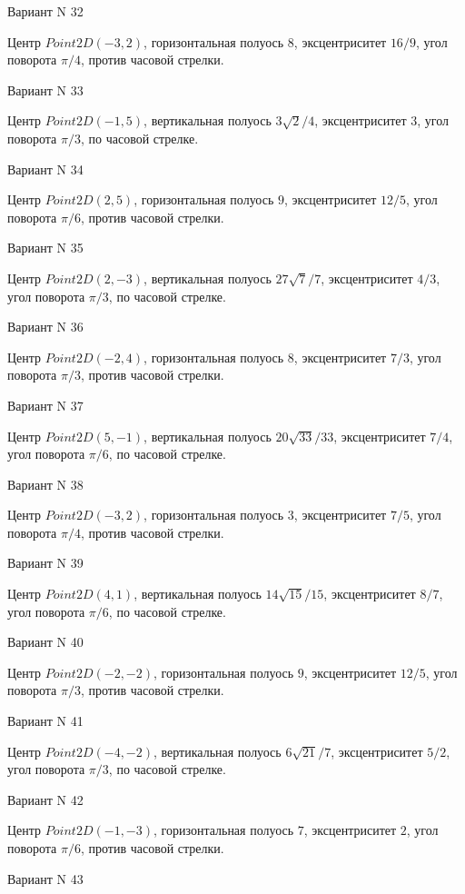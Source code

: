 \documentclass[11pt]{report}
\begin{document}
Вариант N 32

Центр $Point2D\left(-3, 2\right)$, горизонтальная полуось $8$, эксцентриситет $16 / 9$, угол поворота $\pi / 4$, против часовой стрелки.

Вариант N 33

Центр $Point2D\left(-1, 5\right)$, вертикальная полуось $3 \sqrt{2} / 4$, эксцентриситет $3$, угол поворота $\pi / 3$, по часовой стрелке.

Вариант N 34

Центр $Point2D\left(2, 5\right)$, горизонтальная полуось $9$, эксцентриситет $12 / 5$, угол поворота $\pi / 6$, против часовой стрелки.

Вариант N 35

Центр $Point2D\left(2, -3\right)$, вертикальная полуось $27 \sqrt{7} / 7$, эксцентриситет $4 / 3$, угол поворота $\pi / 3$, по часовой стрелке.

Вариант N 36

Центр $Point2D\left(-2, 4\right)$, горизонтальная полуось $8$, эксцентриситет $7 / 3$, угол поворота $\pi / 3$, против часовой стрелки.

Вариант N 37

Центр $Point2D\left(5, -1\right)$, вертикальная полуось $20 \sqrt{33} / 33$, эксцентриситет $7 / 4$, угол поворота $\pi / 6$, по часовой стрелке.

Вариант N 38

Центр $Point2D\left(-3, 2\right)$, горизонтальная полуось $3$, эксцентриситет $7 / 5$, угол поворота $\pi / 4$, против часовой стрелки.

Вариант N 39

Центр $Point2D\left(4, 1\right)$, вертикальная полуось $14 \sqrt{15} / 15$, эксцентриситет $8 / 7$, угол поворота $\pi / 6$, по часовой стрелке.

Вариант N 40

Центр $Point2D\left(-2, -2\right)$, горизонтальная полуось $9$, эксцентриситет $12 / 5$, угол поворота $\pi / 3$, против часовой стрелки.

Вариант N 41

Центр $Point2D\left(-4, -2\right)$, вертикальная полуось $6 \sqrt{21} / 7$, эксцентриситет $5 / 2$, угол поворота $\pi / 3$, по часовой стрелке.

Вариант N 42

Центр $Point2D\left(-1, -3\right)$, горизонтальная полуось $7$, эксцентриситет $2$, угол поворота $\pi / 6$, против часовой стрелки.

Вариант N 43
\end{document}
